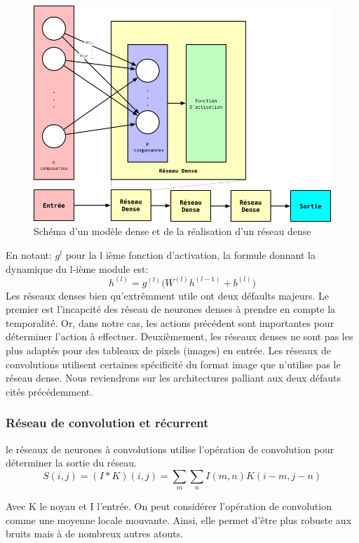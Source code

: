 \begin{figure}[ht]
\begin{center}
    \includegraphics[scale=.3]{./assets/DeepLearning/Dense}
    \caption{Schéma d'un modèle dense et de la réalisation d'un réseau dense}
\end{center}
\end{figure}
En notant: $g^l$ pour la l ième fonction d'activation, la formule donnant la dynamique du l-ième module est: $$h^{(l)} = g^{(l)}\big(W^{(l)}h^{(l-1)} + b^{(l)} \big)$$
Les réseaux denses bien qu'extrêmment utile ont deux défaults majeurs. Le premier est l'incapcité des réseau de neurones denses à prendre en compte la temporalité. Or, dans notre cas, les actions précédent sont importantes pour déterminer l'action à effectuer. Deuxièmement, les réseaux denses ne sont pas les plus adaptés pour des tableaux de pixels (images) en entrée. Les réseaux de convolutions utilisent certaines spécificité du format image que n'utilise pas le réseau dense. Nous reviendrons sur les architectures palliant aux deux défauts cités précédemment. 

\subsubsection{Réseau de convolution et récurrent}
le réseaux de neurones à convolutions utilise l'opération de convolution pour déterminer la sortie du réseau. 
$$S(i,j) = (I * K) (i, j) = \underset{m}{\sum} \underset{n}{\sum} I(m,n) K(i-m, j-n)$$

Avec K le noyau et I l'entrée. On peut considérer l'opération de convolution comme une moyenne locale mouvante. Ainsi, elle permet d'être plus robuste aux bruits mais à de nombreux autres atouts.


